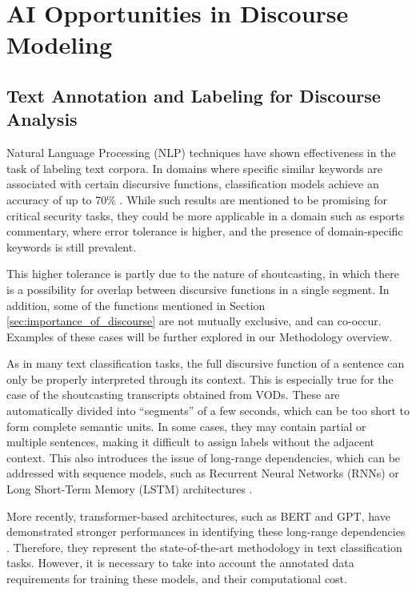 \section{AI Opportunities in Discourse Modeling}
\label{sec:introduction:ai_opportunities_in_discourse_modeling}

\subsection{Text Annotation and Labeling for Discourse Analysis}
\label{subsec:labeling_and_annotation_of_text_segments}

Natural Language Processing (NLP) techniques have shown effectiveness in the task of labeling text corpora. In domains where specific similar keywords are associated with certain discursive functions, classification models achieve an accuracy of up to 70\% \cite{su2024natural}. While such results are mentioned to be promising for critical security tasks, they could be more applicable in a domain such as esports commentary, where error tolerance is higher, and the presence of domain-specific keywords is still prevalent. 

\medskip

This higher tolerance is partly due to the nature of shoutcasting, in which there is a possibility for overlap between discursive functions in a single segment. In addition, some of the functions mentioned in Section \ref{sec:importance_of_discourse} are not mutually exclusive, and can co-occur. Examples of these cases will be further explored in our Methodology overview. 

\medskip

As in many text classification tasks, the full discursive function of a sentence can only be properly interpreted through its context. This is especially true for the case of the shoutcasting transcripts obtained from VODs. These are automatically divided into ``segments'' of a few seconds, which can be too short to form complete semantic units. In some cases, they may contain partial or multiple sentences, making it difficult to assign labels without the adjacent context. This also introduces the issue of long-range dependencies, which can be addressed with sequence models, such as Recurrent Neural Networks (RNNs) or Long Short-Term Memory (LSTM) architectures \cite{abdullahi2021deep}.

\medskip

More recently, transformer-based architectures, such as BERT and GPT, have demonstrated stronger performances in identifying these long-range dependencies \cite{wu2025advancementsnaturallanguageprocessing}. Therefore, they represent the state-of-the-art methodology in text classification tasks. However, it is necessary to take into account the annotated data requirements for training these models, and their computational cost. 

